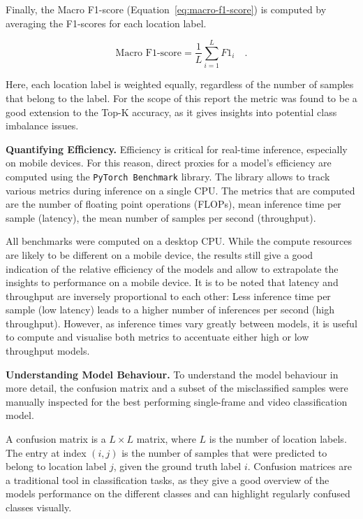 \documentclass[a4paper]{article}
\begin{document}
Finally, the Macro F1-score (Equation~\ref{eq:macro-f1-score}) is computed by
averaging the F1-scores for each location label.

\begin{equation}
  \text{Macro F1-score} = \frac{1}{L} \sum_{i=1}^{L} F1_i \quad .
  \label{eq:macro-f1-score}
\end{equation}

Here, each location label is weighted equally, regardless of the number of
samples that belong to the label. For the scope of this report the metric was
found to be a good extension to the Top-K accuracy, as it gives insights into
potential class imbalance issues.

\textbf{Quantifying Efficiency.} Efficiency is critical for real-time inference,
especially on mobile devices. For this reason, direct proxies for a model's
efficiency are computed using the \texttt{PyTorch Benchmark} library. The
library allows to track various metrics during inference on a single CPU. The
metrics that are computed are the number of floating point operations (FLOPs),
mean inference time per sample (latency), the mean number of samples per second
(throughput).

All benchmarks were computed on a desktop CPU. While the compute resources are
likely to be different on a mobile device, the results still give a good
indication of the relative efficiency of the models and allow to extrapolate the
insights to performance on a mobile device. It is to be noted that latency and
throughput are inversely proportional to each other: Less inference time per
sample (low latency) leads to a higher number of inferences per second (high
throughput). However, as inference times vary greatly between models, it is
useful to compute and visualise both metrics to accentuate either high or low
throughput models.

\textbf{Understanding Model Behaviour.}  To understand the model behaviour in
more detail, the confusion matrix and a subset of the misclassified samples were
manually inspected for the best performing single-frame and video classification
model. 

A confusion matrix is a $L \times L$ matrix, where $L$ is the number of
location labels. The entry at index $(i,j)$ is the number of samples that were
predicted to belong to location label $j$, given the ground truth label $i$.
Confusion matrices are a traditional tool in classification tasks, as they give
a good overview of the models performance on the different classes and can
highlight regularly confused classes visually.
\end{document}
